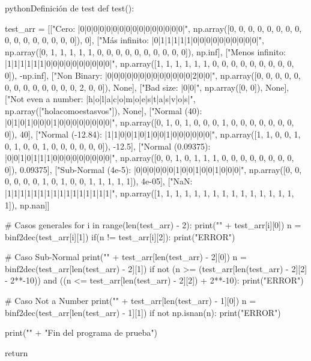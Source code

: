 		
		\begin{sourcecode}[\label{codigo-python-5}]{python}{Definición de test}
def test():

	test_arr = [["Cero: |0|0|0|0|0|0|0|0|0|0|0|0|0|0|0|0|",
	             np.array([0, 0, 0, 0, 0, 0, 0, 0, 0, 0, 0, 0, 0, 0, 0, 0]),	   0],
                ["Más infinito: |0|1|1|1|1|1|0|0|0|0|0|0|0|0|0|0|",
                 np.array([0, 1, 1, 1, 1, 1, 0, 0, 0, 0, 0, 0, 0, 0, 0, 0]),  np.inf],
                ["Menos infinito: |1|1|1|1|1|1|0|0|0|0|0|0|0|0|0|0|",
                 np.array([1, 1, 1, 1, 1, 1, 0, 0, 0, 0, 0, 0, 0, 0, 0, 0]), -np.inf],
                ["Non Binary: |0|0|0|0|0|0|0|0|0|0|0|0|0|2|0|0|",
                 np.array([0, 0, 0, 0, 0, 0, 0, 0, 0, 0, 0, 0, 0, 2, 0, 0]), 	None],
                ["Bad size: |0|0|",
                 np.array([0, 0]),                                           	None],
                ["Not even a number: |h|o|l|a|c|o|m|o|e|s|t|a|s|v|o|s|",
                 np.array(["holacomoestasvos"]),                             	None],
                ["Normal (40): |0|1|0|1|0|0|0|1|0|0|0|0|0|0|0|0|",
                 np.array([0, 1, 0, 1, 0, 0, 0, 1, 0, 0, 0, 0, 0, 0, 0, 0]), 	  40],
                ["Normal (-12.84): |1|1|0|0|1|0|1|0|0|1|0|0|0|0|0|0|",
                 np.array([1, 1, 0, 0, 1, 0, 1, 0, 0, 1, 0, 0, 0, 0, 0, 0]),   -12.5],
                ["Normal (0.09375): |0|0|1|0|1|1|1|0|0|0|0|0|0|0|0|0|",
                 np.array([0, 0, 1, 0, 1, 1, 1, 0, 0, 0, 0, 0, 0, 0, 0, 0]), 0.09375],
                ["Sub-Normal (4e-5): |0|0|0|0|0|0|1|0|0|1|0|0|1|0|0|0|",
                 np.array([0, 0, 0, 0, 0, 0, 1, 0, 1, 0, 0, 1, 1, 1, 1, 1]),   4e-05],
                ["NaN: |1|1|1|1|1|1|1|1|1|1|1|1|1|1|1|1|",
                 np.array([1, 1, 1, 1, 1, 1, 1, 1, 1, 1, 1, 1, 1, 1, 1, 1]),  np.nan]]


    # Casos generales
    for i in range(len(test_arr) - 2):
        print("\n" + test_arr[i][0])
        n = binf2dec(test_arr[i][1])
        if(n != test_arr[i][2]):
            print("ERROR")

    # Caso Sub-Normal
    print("\n" + test_arr[len(test_arr) - 2][0])
    n = binf2dec(test_arr[len(test_arr) - 2][1])
    if not (n >= (test_arr[len(test_arr) - 2][2] - 2**-10))
    and ((n <= test_arr[len(test_arr) - 2][2]) + 2**-10):
        print("ERROR")

    # Caso Not a Number
    print("\n" + test_arr[len(test_arr) - 1][0])
    n = binf2dec(test_arr[len(test_arr) - 1][1])
    if not np.isnan(n):
        print("ERROR")

    print("\n" + "Fin del programa de prueba")
    
    return\end{sourcecode}



